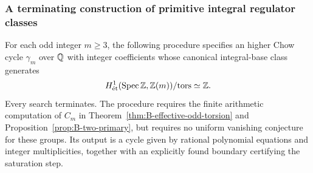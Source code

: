 \subsubsection{A terminating construction of primitive integral regulator classes}

\begin{theorem}
\label{thm:B-primitive-generator}
For each odd integer \(m\ge3\), the following procedure specifies an
higher Chow cycle \(\gamma_m\) over \(\mathbb Q\) with integer
coefficients whose canonical integral-base class generates
\[
 H^1_{\mathrm{\acute et}}(\operatorname{Spec}\mathbb Z,\mathbb Z(m))/\mathrm{tors}
 \simeq\mathbb Z.
\]
Every search terminates.  The procedure requires the finite arithmetic
computation of \(C_m\) in Theorem~\ref{thm:B-effective-odd-torsion}
and Proposition~\ref{prop:B-two-primary}, but requires no uniform
vanishing conjecture for these groups.  Its output is a cycle given by
rational polynomial equations and integer multiplicities, together with
an explicitly found boundary certifying the saturation step.
\end{theorem}
